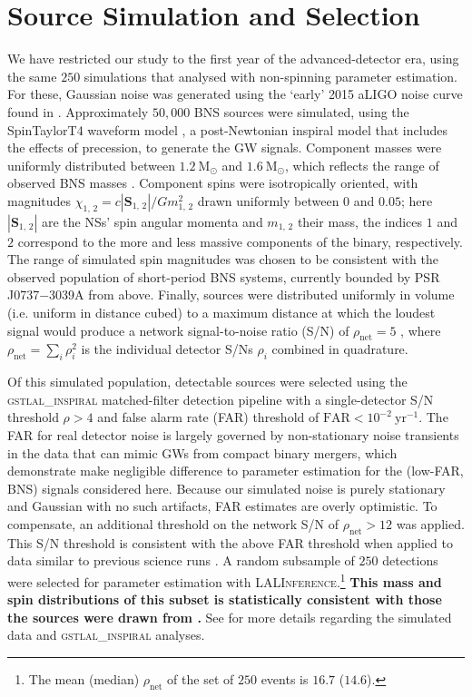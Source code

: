 \section{Source Simulation and Selection}\label{sec:sources}

We have restricted our study to the first year of the advanced-detector era, using the same $250$ simulations that \citet{Singer_2014} analysed with non-spinning parameter estimation. For these, Gaussian noise was generated using the `early' 2015 aLIGO noise curve found in \citet{Barsotti:2012}. Approximately $50,000$ BNS sources were simulated, using the SpinTaylorT4 waveform model \citep{Buonanno_2003,Buonanno_2009}, a post-Newtonian inspiral model that includes the effects of precession, to generate the GW signals. Component masses were uniformly distributed between $1.2~\mathrm{M}_\odot$ and $1.6~\mathrm{M}_\odot$, which reflects the range of observed BNS masses \citep{_zel_2012}. Component spins were isotropically oriented, with magnitudes $\chi_{1,\,2} = c |\mathbf{S}_{1,\,2}|/G m_{1,\,2}^2$ drawn uniformly between $0$ and $0.05$; here $|\mathbf{S}_{1,\,2}|$ are the NSs' spin angular momenta and $m_{1,\,2}$ their mass, the indices $1$ and $2$ correspond to the more and less massive components of the binary, respectively.  The range of simulated spin magnitudes was chosen to be consistent with the observed population of short-period BNS systems, currently bounded by PSR J0737$-$3039A \citep{Burgay_2003,Brown_2012} from above.  Finally, sources were distributed uniformly in volume (i.e. uniform in distance cubed) to a maximum distance at which the loudest signal would produce a network signal-to-noise ratio (S/N) of $\rho_\mathrm{net} = 5$ \citep{Singer_2014}, where $\rho_\mathrm{net} = \sum_i \rho_i^2$ is the individual detector S/Ns $\rho_i$ combined in quadrature.

Of this simulated population, detectable sources were selected using the \textsc{gstlal\_inspiral} matched-filter detection pipeline \citep{Cannon_2012} with a single-detector S/N threshold $\rho>4$ and false alarm rate (FAR) threshold of $\mathrm{FAR}<10^{-2}~\mathrm{yr}^{-1}$.  The FAR for real detector noise is largely governed by non-stationary noise transients in the data that can mimic GWs from compact binary mergers, which \citet{Berry_2014} demonstrate make negligible difference to parameter estimation for the (low-FAR, BNS) signals considered here.  Because our simulated noise is purely stationary and Gaussian with no such artifacts, FAR estimates are overly optimistic. To compensate, an additional threshold on the network S/N of $\rho_\mathrm{net} > 12$ was applied. This S/N threshold is consistent with the above FAR threshold when applied to data similar to previous science runs \citep{2013arXiv1304.0670L,Berry_2014}. A random subsample of $250$ detections were selected for parameter estimation with \textsc{LALInference}.\footnote{The mean (median) $\rho_\mathrm{net}$ of the set of $250$ events is $16.7$ ($14.6$).} \textbf{This mass and spin distributions of this subset is statistically consistent with those the sources were drawn from \citep{Berry_2014}.} See \citet{Singer_2014} for more details regarding the simulated data and \textsc{gstlal\_inspiral} analyses.
  